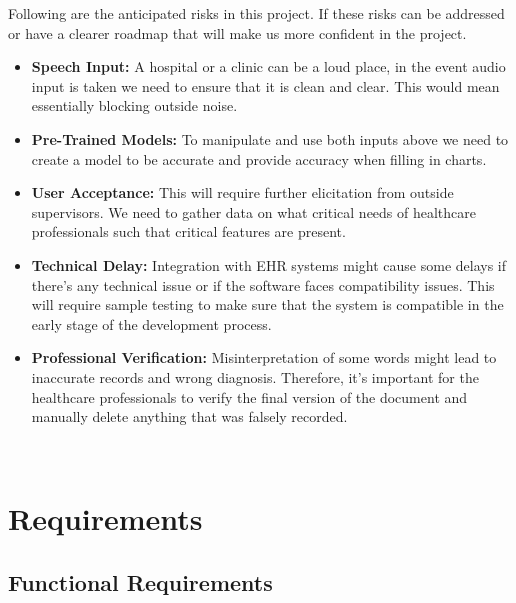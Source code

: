 \documentclass[12pt]{article}
\begin{document}
Following are the anticipated risks in this project. If these risks can be addressed or have a clearer roadmap that will make us more confident in the project. 

\begin{itemize}
  \item \textbf{Speech Input:} A hospital or a clinic can be a loud place, in the event audio input is taken we need to ensure that it is clean and clear. This would mean essentially blocking outside noise. 
  \item \textbf{Pre-Trained Models:} To manipulate and use both inputs above we need to create a model to be accurate and provide accuracy when filling in charts. 
  \item \textbf{User Acceptance:} This will require further elicitation from outside supervisors. We need to gather data on what critical needs of healthcare professionals such that critical features are present.
  \item \textbf{Technical Delay:} Integration with EHR systems might cause some delays if there’s any technical issue or if the software faces compatibility issues. This will require sample testing to make sure that the system is compatible in the early stage of the development process.
  \item \textbf{Professional Verification:} Misinterpretation of some words might lead to inaccurate records and wrong diagnosis. Therefore, it’s important for the healthcare professionals to verify the final version of the document and manually delete anything that was falsely recorded. 
\end{itemize}

~\newpage

\section{Requirements} \label{sec_Requirements}


\subsection{Functional Requirements} \label{sec_FunctionalRequirements}
\end{document}
